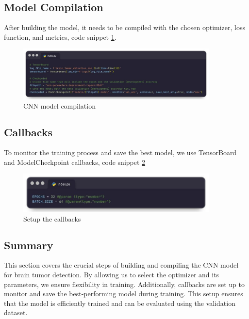 \subsection{Model Compilation}

After building the model, it needs to be compiled with the chosen optimizer, loss function, and metrics, code snippet \ref{fig:brain_tumor_compilation}.

\begin{figure}
    \centering
    \includegraphics[width=0.90\textwidth]{Img/Chap-01/23.jpg}
    \caption{CNN model compilation}
    \label{fig:brain_tumor_compilation}
\end{figure}

\subsection{ Callbacks}
To monitor the training process and save the best model, we use TensorBoard and ModelCheckpoint callbacks, code snippet \ref{fig:brain_tumor_callbacks}

\begin{figure}
 \centering
    \includegraphics[width=0.90\textwidth]{Img/Chap-01/24.jpg}
    \caption{Setup the callbacks}
    \label{fig:brain_tumor_callbacks}
\end{figure}

\subsection{Summary}
This section covers the crucial steps of building and compiling the CNN model for brain tumor detection. By allowing us to select the optimizer and its parameters, we ensure flexibility in training. Additionally, callbacks are set up to monitor and save the best-performing model during training. This setup ensures that the model is efficiently trained and can be evaluated using the validation dataset.

